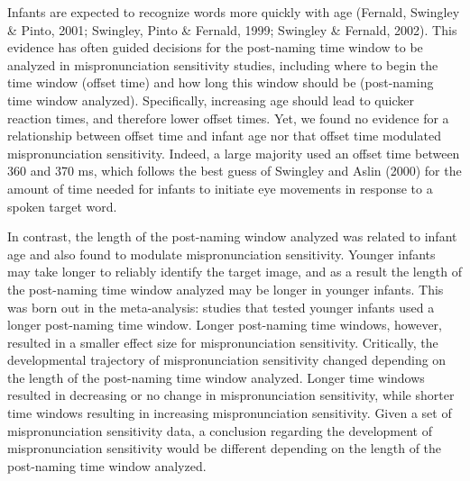 \documentclass[man]{apa6}
\theoremstyle{definition}
\theoremstyle{definition}
\theoremstyle{definition}
\theoremstyle{remark}
\begin{document}
Infants are expected to recognize words more quickly with age (Fernald,
Swingley \& Pinto, 2001; Swingley, Pinto \& Fernald, 1999; Swingley \&
Fernald, 2002). This evidence has often guided decisions for the
post-naming time window to be analyzed in mispronunciation sensitivity
studies, including where to begin the time window (offset time) and how
long this window should be (post-naming time window analyzed).
Specifically, increasing age should lead to quicker reaction times, and
therefore lower offset times. Yet, we found no evidence for a
relationship between offset time and infant age nor that offset time
modulated mispronunciation sensitivity. Indeed, a large majority used an
offset time between 360 and 370 ms, which follows the best guess of
Swingley and Aslin (2000) for the amount of time needed for infants to
initiate eye movements in response to a spoken target word.

In contrast, the length of the post-naming window analyzed was related
to infant age and also found to modulate mispronunciation sensitivity.
Younger infants may take longer to reliably identify the target image,
and as a result the length of the post-naming time window analyzed may
be longer in younger infants. This was born out in the meta-analysis:
studies that tested younger infants used a longer post-naming time
window. Longer post-naming time windows, however, resulted in a smaller
effect size for mispronunciation sensitivity. Critically, the
developmental trajectory of mispronunciation sensitivity changed
depending on the length of the post-naming time window analyzed. Longer
time windows resulted in decreasing or no change in mispronunciation
sensitivity, while shorter time windows resulting in increasing
mispronunciation sensitivity. Given a set of mispronunciation
sensitivity data, a conclusion regarding the development of
mispronunciation sensitivity would be different depending on the length
of the post-naming time window analyzed.
\end{document}
